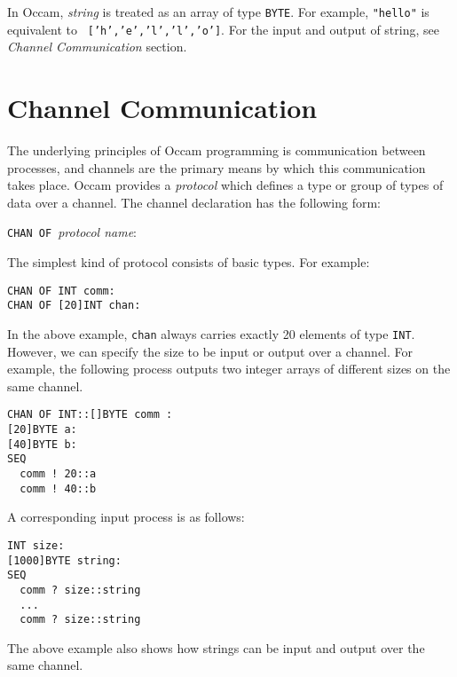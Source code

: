 In Occam, {\em string} is treated as an array of type {\tt BYTE}.
For example, {\tt "hello"} is equivalent to \mbox{{\tt
['h','e','l','l','o']}}.  For the input and output of string, see {\em
Channel Communication} section.

\section{Channel Communication}

The underlying principles of Occam programming is communication
between processes, and channels are the primary means by which this
communication takes place.  Occam provides a {\em protocol} which
defines a type or group of types of data over a channel.  The channel
declaration has the following form:
\begin{lin}
{\tt CHAN OF}\ {\em protocol name}:
\end{lin}


The simplest kind of protocol consists of basic types.  For example:
\begin{lin}
\begin{verbatim}
CHAN OF INT comm:
CHAN OF [20]INT chan:
\end{verbatim}
\end{lin}
In the above example, {\tt chan} always carries exactly 20 elements of
type {\tt INT}.  However, we can specify the size to be input or
output over a channel. For example, the following process outputs two
integer arrays of different sizes on the same channel.
\begin{lin}
\begin{verbatim}
CHAN OF INT::[]BYTE comm :
[20]BYTE a:
[40]BYTE b:
SEQ
  comm ! 20::a
  comm ! 40::b
\end{verbatim}
\end{lin}
A corresponding input process is as follows:
\begin{lin}
\begin{verbatim}
INT size:
[1000]BYTE string:
SEQ
  comm ? size::string
  ...
  comm ? size::string
\end{verbatim}
\end{lin}
The above example also shows how strings can be input and output over
the same channel.



